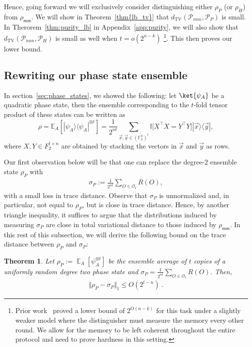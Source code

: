 \documentclass[11pt]{article}
\newtheorem{theorem}{Theorem}[section]
\newcommand{\E}{\mathop{\mathbb{E}}}
\newcommand{\ketbra}[2]{|#1\rangle\langle#2|}
\newcommand{\Exp}{{\mathbb{E}}}
\newcommand{\id}{\ensuremath{\mathbb{I}}}
\newcommand{\F}{\mathbb{F}}
\newcommand{\TV}{d_{\text{TV}}}
\newcommand{\Oc}{\mathcal{O}}
\begin{document}
Hence, going forward we will exclusively consider distinguishing either $\rho_P$ (or $\rho_H$) from $\rho_{\textsf{mm}}$. We will show in Theorem~\ref{thm{lb_tv}} that $\TV(\mathcal{P}_{mm}, \mathcal{P}_P)$ is small. In Therorem~\ref{thm:purity_lb} in Appendix~\ref{app:purity}, we will also show that $\TV(\mathcal{P}_{mm}, \mathcal{P}_{H})$ is small as well when $t = o(2^{n-k})$ \footnote{Prior work~\cite{chen2024optimal} proved a lower bound of $2^{O(n-k)}$ for this task under a slightly weaker model where the distinguisher must measure the memory every other round. We allow for the memory to be left coherent throughout the entire protocol and need to prove hardness in this setting.}. This then proves our lower bound. 



\subsection{Rewriting our phase state ensemble}
\label{sec:simplifyhardensemble}

In section~\ref{sec:phase_states}, we showed the following: let $\ket{\psi_A}$ be a quadratic phase state, then the ensemble corresponding to the $t$-fold tensor product of these states can be written as
$$
\rho=\Exp_A[\ketbra{\psi_A}{\psi_A}^{\otimes t}]=\frac{1}{2^{nt}}\sum_{\vec{x},\vec{y}\in (\F_2^n)^t}\id\Big[X^\top X = Y^\top Y]\ketbra{\vec{x}}{\vec{y}},
$$
where $X,Y \in F_2^{t \times n}$ are obtained by stacking the vectors in $\vec{x}$ and $\vec{y}$ as rows.

Our first observation below will be that one can replace the degree-$2$ ensemble state $\rho_P$ with
\begin{align}
    \sigma_P := \frac{1}{2^{nt}}\sum_{O \in \Oc_t}R(O),
\end{align}
with a small loss in trace distance. 
Observe that $\sigma_{P}$ is unnormalized and, in particular, not equal to $\rho_P$, but is close in trace distance. Hence, by another triangle inequality, it suffices to argue that the distributions induced by measuring $\sigma_P$ are close in total variational distance to those induced by $\rho_{\textsf{mm}}$.  In this rest of this subsection, we will derive the following bound on the trace distance between $\rho_P$ and $\sigma_P$:

\begin{theorem}\label{thm:tvd_orthogonal}
    Let $\rho_P := \E_{A}[\psi_A^{\otimes t}]$ be the ensemble average of $t$ copies of a uniformly random degree two phase state and $\sigma_P = \frac{1}{2^{nt}} \sum_{O \in \Oc_t}R(O)$. Then,
    \begin{align}
        \Vert \rho_P - \sigma_P\Vert_1 \leq O(2^{t-n})\ .
    \end{align}
\end{theorem}
\end{document}
